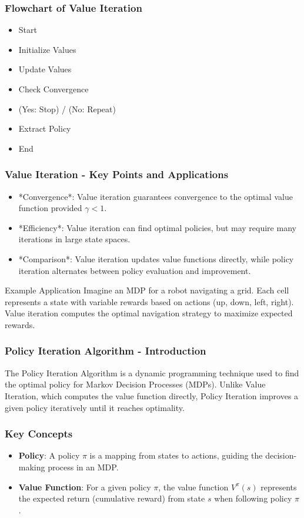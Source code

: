 \documentclass[aspectratio=169]{beamer}
\begin{document}
\begin{frame}[fragile]
    \frametitle{Flowchart of Value Iteration}
    \begin{itemize}
        \item Start
        \item Initialize Values
        \item Update Values
        \item Check Convergence
        \item (Yes: Stop) / (No: Repeat)
        \item Extract Policy
        \item End
    \end{itemize}
\end{frame}

\begin{frame}[fragile]
    \frametitle{Value Iteration - Key Points and Applications}
    \begin{itemize}
        \item *Convergence*: Value iteration guarantees convergence to the optimal value function provided $\gamma < 1$.
        \item *Efficiency*: Value iteration can find optimal policies, but may require many iterations in large state spaces.
        \item *Comparison*: Value iteration updates value functions directly, while policy iteration alternates between policy evaluation and improvement.
    \end{itemize}
    \begin{block}{Example Application}
        Imagine an MDP for a robot navigating a grid. Each cell represents a state with variable rewards based on actions (up, down, left, right). Value iteration computes the optimal navigation strategy to maximize expected rewards.
    \end{block}
\end{frame}

\begin{frame}[fragile]
    \frametitle{Policy Iteration Algorithm - Introduction}
    The Policy Iteration Algorithm is a dynamic programming technique used to find the optimal policy for Markov Decision Processes (MDPs). Unlike Value Iteration, which computes the value function directly, Policy Iteration improves a given policy iteratively until it reaches optimality.
\end{frame}

\begin{frame}[fragile]
    \frametitle{Key Concepts}
    \begin{itemize}
        \item \textbf{Policy}: A policy \( \pi \) is a mapping from states to actions, guiding the decision-making process in an MDP.
        \item \textbf{Value Function}: For a given policy \( \pi \), the value function \( V^\pi(s) \) represents the expected return (cumulative reward) from state \( s \) when following policy \( \pi \).
    \end{itemize}
\end{frame}
\end{document}
